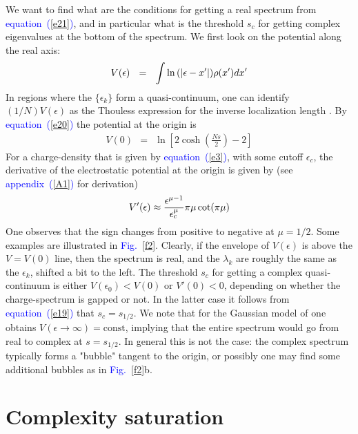 \documentclass[aps,pre,floats,floatfix,twocolumn]{revtex4}
\newcommand{\be}[1]{\begin{eqnarray}\ifthenelse{#1=-1}{\nonumber}{\ifthenelse{#1=0}{}{\label{e#1}}}}
\newcommand{\beq}{\begin{eqnarray}}
\newcommand{\eeq}{\end{eqnarray}}
\newcommand{\Eq}[1]{\textcolor{blue}{{equation}\!~(\ref{#1})}}
\newcommand{\Ap}[1]{\textcolor{blue}{{appendix}\!~(\ref{#1})}}
\newcommand{\Fig}[1]{\textcolor{blue}{Fig.}\!\!~\ref{#1}}
\begin{document}
We want to find what are the conditions for getting 
a real spectrum from \Eq{e21}, and in particular what 
is the threshold $s_c$ for getting complex eigenvalues 
at the bottom of the spectrum. 
We first look on the potential along the real axis:
%
\be{23}
V(\epsilon) \ \ = \ \  \int \ln \left(|\epsilon-x' \right|) \rho(x')dx' 
\eeq
%
In regions where the $\{\epsilon_k\}$ form a quasi-continuum,  
one can identify $(1/N)V(\epsilon)$ as the Thouless expression  
for the inverse localization length \cite{Shnerb1}.
By \Eq{e20} the potential at the origin is 
%
\beq
V(0) \ \ = \ \ \ln\left[2\cosh\left(\frac{Ns}{2}\right)-2\right]
\eeq
%
For a charge-density that is given by \Eq{e3}, with some cutoff $\epsilon_c$,
the derivative of the electrostatic potential at the origin is 
given by (see \Ap{A1} for derivation)
%
\be{19}
V'(\epsilon) \approx  \frac{ \epsilon^{\mu-1}}{\epsilon_c^{\mu}} \pi \mu \cot(\pi \mu)
\eeq
%
One observes that the sign changes from positive to negative at $\mu=1/2$.
Some examples are illustrated in \Fig{f2}.
Clearly, if the envelope of $V(\epsilon)$ is above 
the $V=V(0)$ line, then the spectrum is real, and the $\lambda_k$ are roughly 
the same as the $\epsilon_k$, shifted a bit to the left. 
%
The threshold $s_c$ for getting a complex quasi-continuum 
is either  ${V(\epsilon_0)<V(0)}$  or  ${V'(0)<0}$, 
depending on whether the charge-spectrum is gapped or not. 
In the latter case it follows from \Eq{e19} that ${s_c=s_{1/2}}$.
%
We note that for the Gaussian model of \cite{odh3}
one obtains ${V(\epsilon \rightarrow \infty) = \text{const}}$,  
implying that the entire spectrum would go from real to complex at $s=s_{1/2}$. 
In general this is not the case: the complex spectrum typically 
forms a "bubble" tangent to the origin, or possibly 
one may find some additional bubbles as in \Fig{f2}b.   


\section{Complexity saturation}
\end{document}
